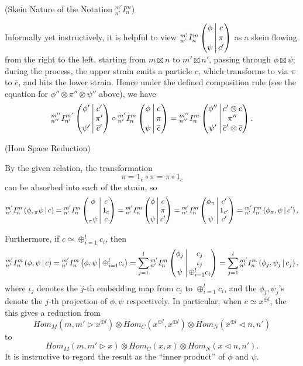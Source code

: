 \begin{remark}\label{remark/skein-nature-of-the-notation-I} (Skein Nature of the Notation ${}^{m'}_{n'}I^{m}_{n}$)

  \noindent Informally yet instructively, it is helpful to view
  ${}^{m'}_{n'} I^{m}_{n} \left( \begin{matrix} \phi \\ {}\\ \psi \end{matrix} \,\middle|\, \begin{matrix} c \\ \pi \\ c' \end{matrix} \right)$ as a skein flowing from the
  right to the left, starting from $m \boxtimes n$ to $m' \boxtimes n'$,
  passing through $\phi \boxtimes \psi$; during the process, the upper strain
  emits a particle $c$, which transforms to via $\pi$ to $\overline{c}$, and
  hits the lower strain. Hence under the defined composition rule (see the
  equation for $\phi'' \otimes \pi'' \otimes \psi''$ above), we have
  \[
    {}^{m''}_{n''} I^{m'}_{n'} \left( \begin{matrix} \phi' \\ {}\\ \psi' \end{matrix} \,\middle|\, \begin{matrix} c' \\ \pi' \\ \overline{c}' \end{matrix} \right) \circ
    {}^{m'}_{n'} I^{m}_{n} \left( \begin{matrix} \phi \\ {}\\ \psi \end{matrix} \,\middle|\, \begin{matrix} c \\ \pi \\ \overline{c} \end{matrix} \right) =
    {}^{m''}_{n''} I^{m}_{n} \left( \begin{matrix} \phi'' \\ {}\\ \psi' \end{matrix} \,\middle|\, \begin{matrix} c' \otimes c \\ \pi'' \\ \overline{c}' \otimes \overline{c} \end{matrix} \right).
  \]
\end{remark}

\begin{remark}\label{remark/hom-space-reduction} (Hom Space Reduction)

  \noindent By the given relation, the
  transformation
  \[
    \pi = 1_{\overline{c}} \circ \pi = \pi \circ 1_{c}
  \]
  can be absorbed into each of the strain, so
  \[
    {}^{m'}_{n'} I^{m}_{n} \left( \phi, {}_{\pi}\psi \,\middle|\, c \right) =
    {}^{m'}_{n'} I^{m}_{n} \left( \begin{matrix} \phi \\ {}\\ {}_{\pi}\psi \end{matrix} \,\middle|\, \begin{matrix} c \\ 1_{c} \\ c \end{matrix} \right) =
    {}^{m'}_{n'} I^{m}_{n} \left( \begin{matrix} \phi \\ {}\\ \psi \end{matrix} \,\middle|\, \begin{matrix} c \\ \pi \\ c' \end{matrix} \right) =
    {}^{m'}_{n'} I^{m}_{n} \left( \begin{matrix} \phi_{\pi} \\ {}\\ \psi \end{matrix} \,\middle|\, \begin{matrix} c' \\ 1_{c'} \\ c' \end{matrix} \right) =
    {}^{m'}_{n'} I^{m}_{n} \left( \phi_{\pi}, \psi \,\middle|\, c' \right).
  \]

  \noindent Furthermore, if $c \simeq \oplus_{i=1}^{l} c_{i}$, then
  \[
    {}^{m'}_{n'} I^{m}_{n} \left( \phi, \psi \,\middle|\, c \right) = {}^{m'}_{n'} I^{m}_{n} \left( \phi, \psi \,\middle|\, \oplus_{i=1}^{l} c_{i} \right) = \sum_{j=1}^{l} {}^{m'}_{n'} I^{m}_{n} \left( \begin{matrix} \phi_{j} \\ {}\\ \psi \end{matrix} \,\middle|\, \begin{matrix} c_{j} \\ \iota_{j} \\ \oplus_{i=1}^{l} c_{i} \end{matrix} \right) =
    \sum_{j=1}^{l}{}^{m'}_{n'} I^{m}_{n} \left( \phi_{j}, \psi_{j} \,\middle|\, c_{j} \right),
  \]
  where $\iota_{j}$ denotes the $j$-th embedding map from $c_{j}$ to
  $\oplus_{i=1}^{l}c_{i}$, and the $\phi_{j}, \psi_{j}$'s denote the $j$-th
  projection of $\phi, \psi$ respectively. In particular, when
  $c \simeq x^{\oplus l}$, the this gives a reduction from
  \[
    Hom_{M}(m, m' \rhd x^{\oplus l}) \otimes Hom_{C}(x^{\oplus l}, x^{\oplus l}) \otimes Hom_{N} (x^{\oplus l} \lhd n, n')
  \]
  to
  \[
    Hom_{M}(m, m' \rhd x) \otimes Hom_{C}(x, x) \otimes Hom_{N} (x \lhd n, n').
  \]
  It is instructive to regard the result as the ``inner product'' of $\phi$
  and $\psi$.
\end{remark}

